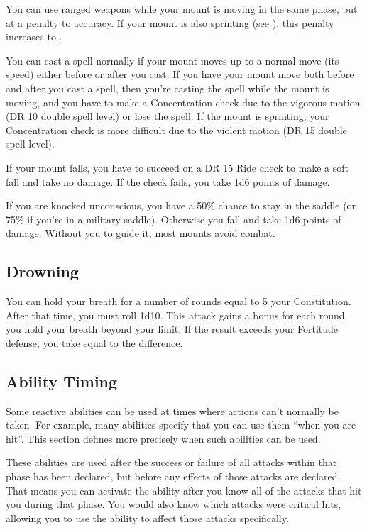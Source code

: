         You can use ranged weapons while your mount is moving in the same phase, but at a  penalty to accuracy.
        If your mount is also sprinting (see ), this penalty increases to .

         You can cast a spell normally if your mount moves up to a normal move (its speed) either before or after you cast. If you have your mount move both before and after you cast a spell, then you're casting the spell while the mount is moving, and you have to make a Concentration check due to the vigorous motion (DR 10 \add double spell level) or lose the spell. If the mount is sprinting, your Concentration check is more difficult due to the violent motion (DR 15 \add double spell level).

         If your mount falls, you have to succeed on a DR 15 Ride check to make a soft fall and take no damage. If the check fails, you take 1d6 points of damage.

         If you are knocked unconscious, you have a 50\% chance to stay in the saddle (or 75\% if you're in a military saddle). Otherwise you fall and take 1d6 points of damage. Without you to guide it, most mounts avoid combat.

    \subsection{Drowning}\label{Drowning}
        You can hold your breath for a number of rounds equal to 5 \add your Constitution.
        After that time, you must roll 1d10.
        This attack gains a  bonus for each round you hold your breath beyond your limit.
        If the result exceeds your Fortitude defense, you take  equal to the difference.

    \subsection{Ability Timing}
        Some reactive abilities can be used at times where actions can't normally be taken.
        For example, many abilities specify that you can use them ``when you are hit''.
        This section defines more precisely when such abilities can be used.

         These abilities are used after the success or failure of all attacks within that phase has been declared, but before any effects of those attacks are declared.
        That means you can activate the ability after you know all of the attacks that hit you during that phase.
        You would also know which attacks were critical hits, allowing you to use the ability to affect those attacks specifically.

